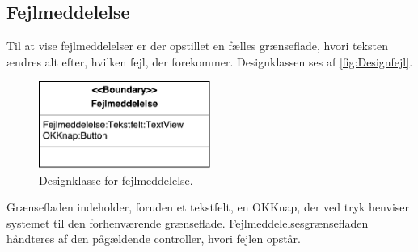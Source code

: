 \subsection*{Fejlmeddelelse}
Til at vise fejlmeddelelser er der opstillet en fælles grænseflade, hvori teksten ændres alt efter, hvilken fejl, der forekommer. Designklassen ses af \autoref{fig:Designfejl}.

\begin{figure} [H]
\centering
\includegraphics[width=0.5\textwidth]{figures/MVC/MVCfejl}
\caption{Designklasse for fejlmeddelelse.}
\label{fig:Designfejl}
\end{figure}

\noindent
Grænsefladen indeholder, foruden et tekstfelt, en OKKnap, der ved tryk henviser systemet til den forhenværende grænseflade. Fejlmeddelelsesgrænsefladen håndteres af den pågældende controller, hvori fejlen opstår. 
